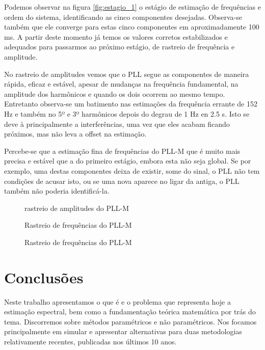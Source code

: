 Podemos observar na figura \ref{fig:estagio_1} o estágio de estimação de frequências e ordem do sistema, identificando as cinco componentes desejadas. Observa-se também que ele converge para estas cinco componentes em aproximadamente 100 ms. A partir deste momento já temos os valores corretos estabilizados e adequados para passarmos ao próximo estágio, de rastreio de frequência e amplitude. 

\indent No rastreio de amplitudes vemos que o PLL segue as componentes de maneira rápida, eficaz e estável, apesar de mudanças na frequência fundamental, na amplitude dos harmônicos e quando os dois ocorrem ao mesmo tempo. Entretanto observa-se um batimento nas estimações da frequência errante de 152 Hz e também no 5º e 3º harmônicos depois do degrau de 1 Hz en 2.5 s. Isto se deve à principalmente a interferências, uma vez que eles acabam ficando próximos, mas não leva a offset na estimação.

\indent Percebe-se que a estimação fina de frequências do PLL-M que é muito mais precisa e estável que a do primeiro estágio, embora esta não seja global. Se por exemplo, uma destas componentes deixa de existir, some do sinal, o PLL não tem condições de acusar isto, ou se uma nova aparece no ligar da antiga, o PLL também não poderia identificá-la.

\begin{figure}[H]
	\centering    
	\def\svgwidth{\columnwidth}
	
	\caption{rastreio de amplitudes do PLL-M}
	\label{fig:rastreio_final}
\end{figure}

\begin{figure}[H]
	\centering    
	\def\svgwidth{\columnwidth}
	
	\caption{Rastreio de frequências do PLL-M}
	\label{fig:amplitudes}
\end{figure}
\begin{figure}[H]
	\centering    
	\def\svgwidth{\columnwidth}
	
	\caption{Rastreio de frequências do PLL-M}
	\label{fig:amplitudes}
\end{figure}


\section{Conclusões}

Neste trabalho apresentamos o que é e o problema que representa hoje a estimação espectral, bem como a fundamentação teórica matemática por trás do tema. Discorremos sobre métodos paramétricos e não paramétricos. Nos focamos principalmente em simular e apresentar alternativas para duas metodologias relativamente recentes, publicadas nos últimos 10 anos. 

